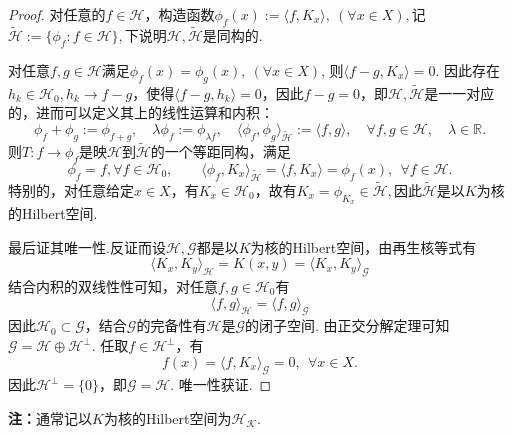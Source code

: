 \documentclass[12pt, a4paper, oneside]{ctexbook}
\begin{document}
\begin{proof}
    对任意的$f\in\mathcal{H}$，构造函数$\phi_f(x):=\langle f,K_x\rangle,~(\forall x\in X),$记$\widetilde{\mathcal{H}}:=\{\phi_f:f\in\mathcal{H}\},$下说明$\mathcal{H},\widetilde{\mathcal{H}}$是同构的. 
    
    对任意$f,g\in\mathcal{H}$满足$\phi_f(x)=\phi_g(x),~(\forall x\in X)$, 则$\langle f-g,K_x\rangle=0$. 因此存在$h_k\in\mathcal{H}_0,h_k\to f-g$，使得$\langle f-g,  h_k\rangle=0$，因此$f-g=0$，即$\mathcal{H},\widetilde{\mathcal{H}}$是一一对应的，进而可以定义其上的线性运算和内积：
    \begin{equation*}
        \phi_{f}+\phi_{g}:=\phi_{f+g},\quad\lambda\phi_{f}:=\phi_{\lambda f},\quad\langle\phi_{f},\phi_{g}\rangle_{\widetilde{\mathcal{H}}}:=\langle f,g\rangle,\quad\forall f,g\in \mathcal{H},\quad\lambda\in\mathbb{R}.
    \end{equation*}
    则$T:f\to\phi_f$是映$\mathcal{H}$到$\widetilde{\mathcal{H}}$的一个等距同构，满足
    \begin{equation*}
        \phi_{f}=f,\forall f\in \mathcal{H}_{0},\quad\quad\langle\phi_{f},K_x\rangle_{\widetilde{\mathcal{H}}}=\langle f,K_x\rangle=\phi_{f}(x),~~\forall f\in \mathcal{H}.
    \end{equation*}
特别的，对任意给定$x\in X$，有$K_x\in\mathcal{H}_0$，故有$K_x = \phi_{K_x}\in\widetilde{\mathcal{H}},$因此$\widetilde{\mathcal{H}}$是以$K$为核的Hilbert空间.

最后证其唯一性.反证而设$\mathcal{H},\mathcal{G}$都是以$K$为核的Hilbert空间，由再生核等式有
\begin{equation*}
    \langle K_x,K_y\rangle_{\mathcal{H}}=K(x,y)=\langle K_x,K_y\rangle_{\mathcal{G}}
\end{equation*}
结合内积的双线性性可知，对任意$f,g\in \mathcal{H}_0$有
\begin{equation*}
    \langle f,g\rangle_{\mathcal{H}}=\langle f,g\rangle_{\mathcal{G}}
\end{equation*}
因此$\mathcal{H}_0\subset \mathcal{G}$，结合$\mathcal{G}$的完备性有$\mathcal{H}$是$\mathcal{G}$的闭子空间. 由正交分解定理可知$\mathcal{G}=\mathcal{H}\oplus\mathcal{H}^{\perp}$. 任取$f\in\mathcal{H}^\perp$，有
\begin{equation*}
    f(x)=\langle f,K_x\rangle_{\mathcal{G}}=0,~~\forall x\in X.
\end{equation*}
因此$\mathcal{H}^{\perp}=\{0\}$，即$\mathcal{G}=\mathcal{H}$. 唯一性获证.
\end{proof}

\textbf{注：}通常记以$K$为核的Hilbert空间为$\mathcal{H_K}$.
\end{document}
